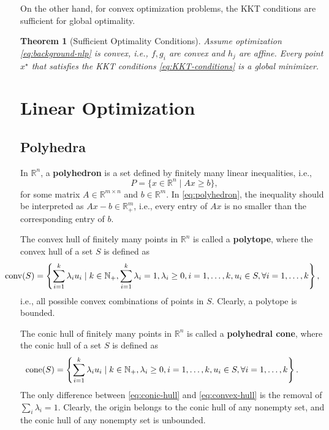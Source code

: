 \documentclass[
]{book}
\newtheorem{theorem}{Theorem}[chapter]
\theoremstyle{definition}
\theoremstyle{definition}
\theoremstyle{definition}
\theoremstyle{definition}
\theoremstyle{remark}
\begin{document}
On the other hand, for convex optimization problems, the KKT conditions are sufficient for global optimality.

\begin{theorem}[Sufficient Optimality Conditions]
\protect\hypertarget{thm:KKTSufficient}{}\label{thm:KKTSufficient}Assume optimization \eqref{eq:background-nlp} is convex, i.e., \(f,g_i\) are convex and \(h_j\) are affine. Every point \(x^\star\) that satisfies the KKT conditions \eqref{eq:KKT-conditions} is a global minimizer.
\end{theorem}

\hypertarget{background:linear:optimization}{%
\section{Linear Optimization}\label{background:linear:optimization}}

\hypertarget{polyhedra}{%
\subsection{Polyhedra}\label{polyhedra}}

In \(\mathbb{R}^{n}\), a \textbf{polyhedron} is a set defined by finitely many linear inequalities, i.e.,
\begin{equation}
P = \{ x \in \mathbb{R}^{n} \mid A x \geq b \},
\label{eq:polyhedron}
\end{equation}
for some matrix \(A \in \mathbb{R}^{m \times n}\) and \(b \in \mathbb{R}^{m}\). In \eqref{eq:polyhedron}, the inequality should be interpreted as \(A x - b \in \mathbb{R}^{m}_{+}\), i.e., every entry of \(Ax\) is no smaller than the corresponding entry of \(b\).

The convex hull of finitely many points in \(\mathbb{R}^{n}\) is called a \textbf{polytope}, where the convex hull of a set \(S\) is defined as
\begin{equation}
\hspace{-10mm} \mathrm{conv}(S) =  \left\{ \sum_{i=1}^k \lambda_i u_i \mid k \in \mathbb{N}_{+}, \sum_{i=1}^k \lambda_i = 1, \lambda_i \geq 0,i=1,\dots,k, u_i \in S, \forall i =1,\dots,k \right\} ,
\label{eq:convex-hull}
\end{equation}
i.e., all possible convex combinations of points in \(S\). Clearly, a polytope is bounded.

The conic hull of finitely many points in \(\mathbb{R}^{n}\) is called a \textbf{polyhedral cone}, where the conic hull of a set \(S\) is defined as
\begin{equation}
\hspace{-10mm} \mathrm{cone}(S) =  \left\{  \sum_{i=1}^k \lambda_i u_i \mid k \in \mathbb{N}_{+}, \lambda_i \geq 0,i=1,\dots,k, u_i \in S, \forall i =1,\dots,k   \right\} .
\label{eq:conic-hull}
\end{equation}
The only difference between \eqref{eq:conic-hull} and \eqref{eq:convex-hull} is the removal of \(\sum_{i} \lambda_i = 1\). Clearly, the origin belongs to the conic hull of any nonempty set, and the conic hull of any nonempty set is unbounded.
\end{document}

